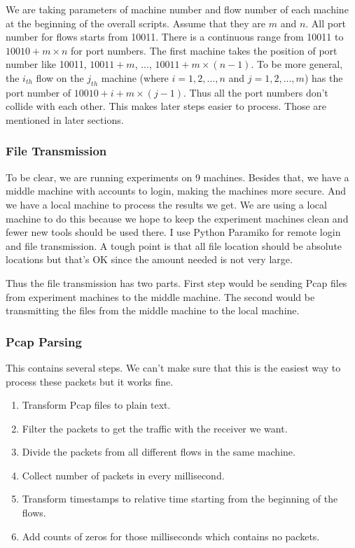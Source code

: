 \documentclass[12pt,a4paper]{article}
\begin{document}
We are taking parameters of machine number and flow number of each machine at the beginning of the overall scripts.
Assume that they are $m$ and $n$.
All port number for flows starts from 10011. There is a continuous range from 10011 to $10010+m\times n$ for port numbers.
The first machine takes the position of port number like 10011, $10011+m$, ..., $10011+m\times(n-1)$.
To be more general, the $i_{th}$ flow on the $j_{th}$ machine (where $i=1,2,...,n$ and $j=1,2,...,m$) has the port number of
$10010+i+m\times(j-1)$.
Thus all the port numbers don't collide with each other. This makes later steps easier to process.
Those are mentioned in later sections.

\subsubsection{File Transmission}
To be clear, we are running experiments on 9 machines.
Besides that, we have a middle machine with accounts to login, making the machines more secure.
And we have a local machine to process the results we get. We are using a local machine to do this because
we hope to keep the experiment machines clean and fewer new tools should be used there.
I use Python Paramiko for remote login and file transmission.
A tough point is that all file location should be absolute locations but that's OK since the amount needed is not very large.

Thus the file transmission has two parts. First step would be sending Pcap files from experiment machines to the middle machine.
The second would be transmitting the files from the middle machine to the local machine.

\subsubsection{Pcap Parsing}
This contains several steps. We can't make sure that this is the easiest way to process these packets but it works fine.
\begin{enumerate}
	\item Transform Pcap files to plain text.
	\item Filter the packets to get the traffic with the receiver we want.
	\item Divide the packets from all different flows in the same machine.
	\item Collect number of packets in every millisecond.
	\item Transform timestamps to relative time starting from the beginning of the flows.
	\item Add counts of zeros for those milliseconds which contains no packets.
\end{enumerate}
\end{document}
